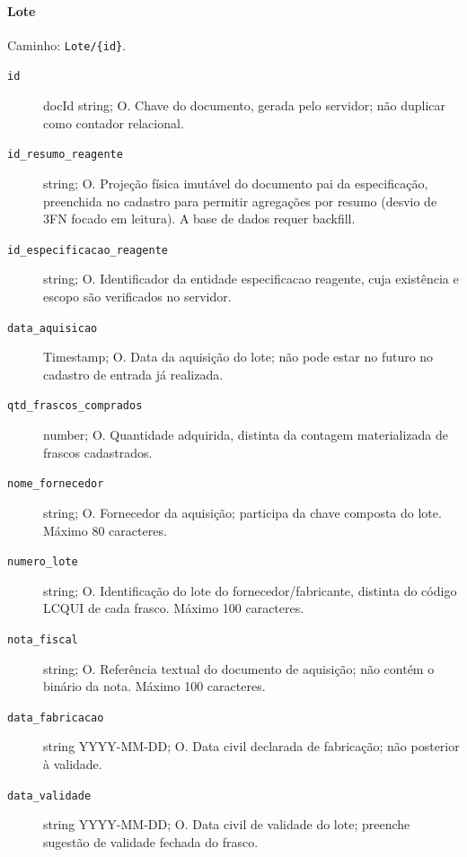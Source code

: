 \paragraph{Lote}\mbox{}\par
Caminho: \texttt{Lote/\{id\}}.
\begin{description}
\item[\texttt{id}] docId string; O. Chave do documento, gerada pelo servidor; não duplicar como contador relacional.
\item[\texttt{id\_resumo\_reagente}] string; O. Projeção física imutável do documento pai da especificação, preenchida no cadastro para permitir agregações por resumo (desvio de 3FN focado em leitura). A base de dados requer backfill.
\item[\texttt{id\_especificacao\_reagente}] string; O. Identificador da entidade especificacao reagente, cuja existência e escopo são verificados no servidor.
\item[\texttt{data\_aquisicao}] Timestamp; O. Data da aquisição do lote; não pode estar no futuro no cadastro de entrada já realizada.
\item[\texttt{qtd\_frascos\_comprados}] number; O. Quantidade adquirida, distinta da contagem materializada de frascos cadastrados.
\item[\texttt{nome\_fornecedor}] string; O. Fornecedor da aquisição; participa da chave composta do lote. Máximo 80 caracteres.
\item[\texttt{numero\_lote}] string; O. Identificação do lote do fornecedor/fabricante, distinta do código LCQUI de cada frasco. Máximo 100 caracteres.
\item[\texttt{nota\_fiscal}] string; O. Referência textual do documento de aquisição; não contém o binário da nota. Máximo 100 caracteres.
\item[\texttt{data\_fabricacao}] string YYYY-MM-DD; O. Data civil declarada de fabricação; não posterior à validade.
\item[\texttt{data\_validade}] string YYYY-MM-DD; O. Data civil de validade do lote; preenche sugestão de validade fechada do frasco.
\end{description}

